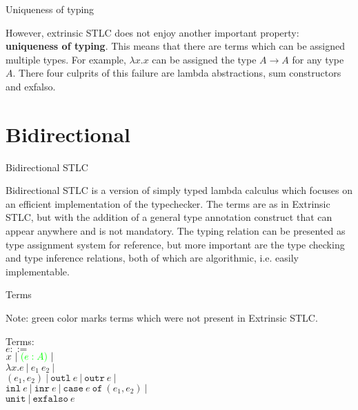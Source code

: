 \documentclass{beamer}
\newcommand{\pipe}{\ |\ }
\newcommand{\Fun}[2]{#1 \to #2}
\newcommand{\annot}[2]{(#1 : #2)}
\newcommand{\fun}[2]{\lambda #1. #2}
\newcommand{\app}[2]{#1\ #2}
\newcommand{\pair}[2]{(#1, #2)}
\newcommand{\outl}[1]{\texttt{outl}\ #1}
\newcommand{\outr}[1]{\texttt{outr}\ #1}
\newcommand{\inl}[1]{\texttt{inl}\ #1}
\newcommand{\inr}[1]{\texttt{inr}\ #1}
\newcommand{\case}[3]{\texttt{case}\ #1\ \texttt{of}\ (#2, #3)}
\newcommand{\unit}{\texttt{unit}}
\newcommand{\exfalso}[1]{\texttt{exfalso}\ #1}
\begin{document}
\begin{frame}{Uniqueness of typing}

However, extrinsic STLC does not enjoy another important property: \textbf{uniqueness of typing}. This means that there are terms which can be assigned multiple types. For example, $\fun{x}{x}$ can be assigned the type $\Fun{A}{A}$ for any type $A$. There four culprits of this failure are lambda abstractions, sum constructors and exfalso.

\end{frame}

\section{Bidirectional}

\newcommand{\newterm}[1]{\mathcolor{green}{#1}}

\begin{frame}{Bidirectional STLC}

Bidirectional STLC is a version of simply typed lambda calculus which focuses on an efficient implementation of the typechecker. The terms are as in Extrinsic STLC, but with the addition of a general type annotation construct that can appear anywhere and is not mandatory. The typing relation can be presented as type assignment system for reference, but more important are the type checking and type inference relations, both of which are algorithmic, i.e. easily implementable.

\end{frame}

\begin{frame}{Terms}

Note: green color marks terms which were not present in Extrinsic STLC.

\vspace{2em}

Terms: \\
$e ::=$ \\
\qquad $x \pipe \newterm{\annot{e}{A}} \pipe$ \\
\qquad $\fun{x}{e} \pipe \app{e_1}{e_2} \pipe$ \\
\qquad $\pair{e_1}{e_2} \pipe \outl{e} \pipe \outr{e} \pipe$ \\
\qquad $\inl{e} \pipe \inr{e} \pipe \case{e}{e_1}{e_2} \pipe$ \\
\qquad $\unit \pipe \exfalso{e}$

\end{frame}
\end{document}
